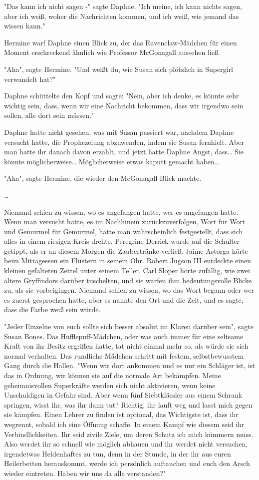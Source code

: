 {"Das kann ich nicht sagen -" sagte Daphne. "Ich meine, ich kann nichts sagen, aber ich weiß, woher die Nachrichten kommen, und ich weiß, wie jemand das wissen kann."

Hermine warf Daphne einen Blick zu, der das Ravenclaw-Mädchen für einen Moment erschreckend ähnlich wie Professor McGonagall aussehen ließ.

"Aha", sagte Hermine. "Und weißt du, wie Susan sich plötzlich in Supergirl verwandelt hat?"

Daphne schüttelte den Kopf und sagte: "Nein, aber ich denke, es könnte sehr wichtig sein, dass, wenn wir eine Nachricht bekommen, dass wir irgendwo sein sollen, alle dort sein müssen."

Daphne hatte nicht gesehen, was mit Susan passiert war, nachdem Daphne versucht hatte, die Prophezeiung abzuwenden, indem sie Susan fernhielt. Aber man hatte ihr danach davon erzählt, und jetzt hatte Daphne Angst, dass… Sie könnte möglicherweise… Möglicherweise etwas kaputt gemacht haben…

"Aha", sagte Hermine, die wieder den McGonagall-Blick machte.

…

Niemand schien zu wissen, wo es angefangen hatte, wer es angefangen hatte. Wenn man versucht hätte, es im Nachhinein zurückzuverfolgen, Wort für Wort und Gemurmel für Gemurmel, hätte man wahrscheinlich festgestellt, dass sich alles in einem riesigen Kreis drehte. Peregrine Derrick wurde auf die Schulter getippt, als er an diesem Morgen die Zaubertränke verließ. Jaime Astorga hörte beim Mittagessen ein Flüstern in seinem Ohr. Robert Jugson III entdeckte einen kleinen gefalteten Zettel unter seinem Teller. Carl Sloper hörte zufällig, wie zwei ältere Gryffindors darüber tuschelten, und sie warfen ihm bedeutungsvolle Blicke zu, als sie vorbeigingen. Niemand schien zu wissen, wo das Wort begann oder wer es zuerst gesprochen hatte, aber es nannte den Ort und die Zeit, und es sagte, dass die Farbe weiß sein würde.

"Jeder Einzelne von euch sollte sich besser absolut im Klaren darüber sein", sagte Susan Bones. Das Hufflepuff-Mädchen, oder was auch immer für eine seltsame Kraft von ihr Besitz ergriffen hatte, tat nicht einmal mehr so, als würde sie sich normal verhalten. Das rundliche Mädchen schritt mit festem, selbstbewusstem Gang durch die Hallen. "Wenn wir dort ankommen und es nur ein Schläger ist, ist das in Ordnung, wir können sie auf die normale Art bekämpfen. Meine geheimnisvollen Superkräfte werden sich nicht aktivieren, wenn keine Unschuldigen in Gefahr sind. Aber wenn fünf Siebtklässler aus einem Schrank springen, wisst ihr, was ihr dann tut? Richtig, ihr lauft weg und lasst mich gegen sie kämpfen. Einen Lehrer zu finden ist optional, das Wichtigste ist, dass ihr wegrennt, sobald ich eine Öffnung schaffe. In einem Kampf wie diesem seid ihr Verbindlichkeiten. Ihr seid zivile Ziele, um deren Schutz ich mich kümmern muss. Also werdet ihr so schnell wie möglich abhauen und ihr werdet nicht versuchen, irgendetwas Heldenhaftes zu tun, denn in der Stunde, in der ihr aus euren Heilerbetten herauskommt, werde ich persönlich auftauchen und euch den Arsch wieder eintreten. Haben wir uns da alle verstanden?"

}
